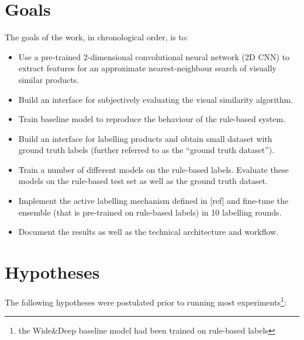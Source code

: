 \section{Goals}

The goals of the work, in chronological order, is to:

\begin{itemize}
  \item Use a pre-trained 2-dimensional convolutional neural network (2D CNN) to extract features for an approximate nearest-neighbour search of visually similar products.
  \item Build an interface for subjectively evaluating the visual similarity algorithm.
  \item Train  baseline model to reproduce the behaviour of the rule-based system.
  \item Build an interface for labelling products and obtain small dataset with ground truth labels (further referred to as the ``ground truth dataset'').
  \item Train a number of different models on the rule-based labels.  Evaluate these models on the rule-based test set as well as the ground truth dataset.
  \item Implement the active labelling mechanism defined in [ref] and fine-tune the ensemble (that is pre-trained on rule-based labels) in 10 labelling rounds.
  \item Document the results as well as the technical architecture and workflow.
\end{itemize}

\section{Hypotheses}

The following hypotheses were postulated prior to running most experiments\footnote{the Wide\&Deep baseline model had been trained on rule-based labels}:

